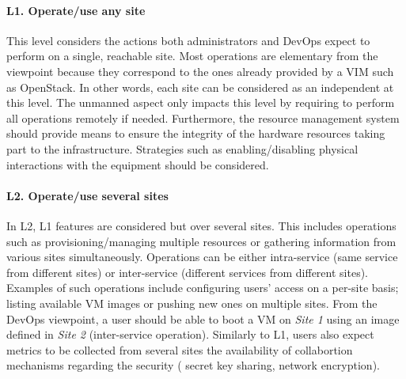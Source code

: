 \paragraph{L1. Operate/use any site}
This level
considers the actions both administrators and DevOps expect to perform on a
single, reachable site.
%
Most operations are elementary from the \edge viewpoint because they correspond
to the ones already provided by a VIM such as OpenStack.
In other words, each \edge site can be considered as an independent \cloud at
this level. The unmanned aspect only impacts this level by requiring to perform
all operations remotely if needed.
Furthermore, the resource management system should provide means to
ensure the integrity of the hardware resources taking part to the \edge
infrastructure. Strategies such as enabling/disabling physical
interactions with the equipment should be considered.




\paragraph{L2. Operate/use several sites}

In L2, L1 features are considered but over several sites. This
includes operations such as provisioning/managing multiple resources or
gathering information from various sites simultaneously.
Operations can be either intra-service (same service from different sites) or
inter-service (different services from different sites). Examples of 
such operations include configuring users'
access on a per-site basis; listing available VM images or pushing new
ones on multiple sites. From the
DevOps viewpoint, a user should be able to boot a VM on \emph{Site 1}
using an image defined in \emph{Site 2}
(inter-service operation). Similarly to L1, users also expect metrics to be collected
from several sites the availability of collabortion mechanisms regarding the security (\eg
secret key sharing, network encryption).

